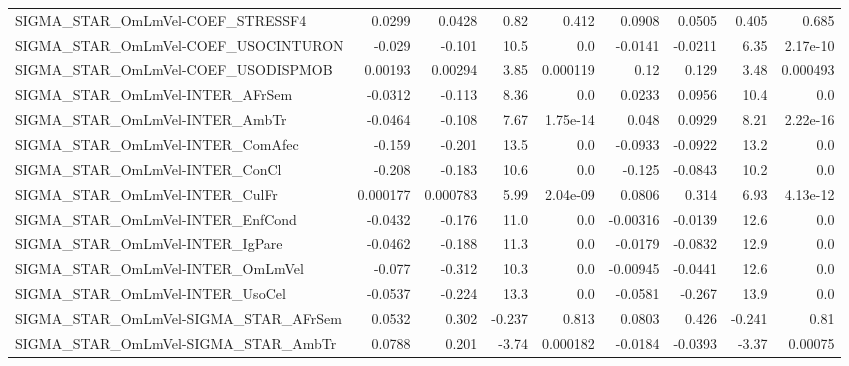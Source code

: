 \begin{tabular}{lrrrrrrrr}
SIGMA\_STAR\_OmLmVel-COEF\_STRESSF4      &      0.0299 &       0.0428 &     0.82 &    0.412 &     0.0908 &      0.0505 &        0.405 &         0.685 \\
SIGMA\_STAR\_OmLmVel-COEF\_USOCINTURON   &      -0.029 &       -0.101 &     10.5 &      0.0 &    -0.0141 &     -0.0211 &         6.35 &      2.17e-10 \\
SIGMA\_STAR\_OmLmVel-COEF\_USODISPMOB    &     0.00193 &      0.00294 &     3.85 & 0.000119 &       0.12 &       0.129 &         3.48 &      0.000493 \\
SIGMA\_STAR\_OmLmVel-INTER\_AFrSem       &     -0.0312 &       -0.113 &     8.36 &      0.0 &     0.0233 &      0.0956 &         10.4 &           0.0 \\
SIGMA\_STAR\_OmLmVel-INTER\_AmbTr        &     -0.0464 &       -0.108 &     7.67 & 1.75e-14 &      0.048 &      0.0929 &         8.21 &      2.22e-16 \\
SIGMA\_STAR\_OmLmVel-INTER\_ComAfec      &      -0.159 &       -0.201 &     13.5 &      0.0 &    -0.0933 &     -0.0922 &         13.2 &           0.0 \\
SIGMA\_STAR\_OmLmVel-INTER\_ConCl        &      -0.208 &       -0.183 &     10.6 &      0.0 &     -0.125 &     -0.0843 &         10.2 &           0.0 \\
SIGMA\_STAR\_OmLmVel-INTER\_CulFr        &    0.000177 &     0.000783 &     5.99 & 2.04e-09 &     0.0806 &       0.314 &         6.93 &      4.13e-12 \\
SIGMA\_STAR\_OmLmVel-INTER\_EnfCond      &     -0.0432 &       -0.176 &     11.0 &      0.0 &   -0.00316 &     -0.0139 &         12.6 &           0.0 \\
SIGMA\_STAR\_OmLmVel-INTER\_IgPare       &     -0.0462 &       -0.188 &     11.3 &      0.0 &    -0.0179 &     -0.0832 &         12.9 &           0.0 \\
SIGMA\_STAR\_OmLmVel-INTER\_OmLmVel      &      -0.077 &       -0.312 &     10.3 &      0.0 &   -0.00945 &     -0.0441 &         12.6 &           0.0 \\
SIGMA\_STAR\_OmLmVel-INTER\_UsoCel       &     -0.0537 &       -0.224 &     13.3 &      0.0 &    -0.0581 &      -0.267 &         13.9 &           0.0 \\
SIGMA\_STAR\_OmLmVel-SIGMA\_STAR\_AFrSem  &      0.0532 &        0.302 &   -0.237 &    0.813 &     0.0803 &       0.426 &       -0.241 &          0.81 \\
SIGMA\_STAR\_OmLmVel-SIGMA\_STAR\_AmbTr   &      0.0788 &        0.201 &    -3.74 & 0.000182 &    -0.0184 &     -0.0393 &        -3.37 &       0.00075 \\

\end{tabular}
